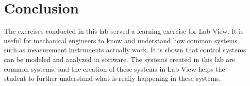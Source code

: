 \documentclass[12pt]{article}
\begin{document}
\bigskip


\section*{\fontsize{12}{12}\selectfont \large Conclusion}
The exercises conducted in this lab served a learning exercise for Lab View. It is useful for mechanical engineers to know and understand how common systems such as measurement instruments actually work. It is shown that control systems can be modeled and analyzed in software. The systems created in this lab are common systems, and the creation of these systems in Lab View helps the student to further understand what is really happening in these systems. 



\begin{thebibliography}{2}


\end{thebibliography}




\end{document}
